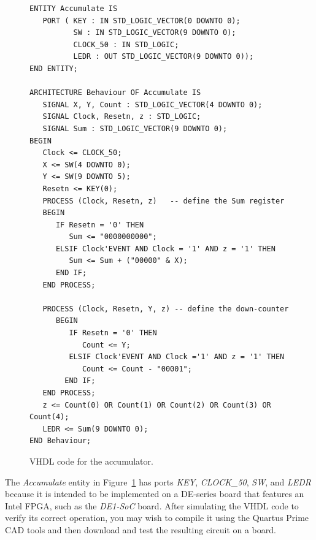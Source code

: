 \documentclass[11pt, twoside, pdftex]{article}
\begin{document}
\lstset{language=VHDL,numbers=none,escapechar=?}
\begin{figure}[hb!]
\begin{center}
\begin{minipage}[t]{15 cm}
\begin{lstlisting}[name=accumulate]
ENTITY Accumulate IS
   PORT ( KEY : IN STD_LOGIC_VECTOR(0 DOWNTO 0);
          SW : IN STD_LOGIC_VECTOR(9 DOWNTO 0);  
          CLOCK_50 : IN STD_LOGIC;
          LEDR : OUT STD_LOGIC_VECTOR(9 DOWNTO 0));
END ENTITY; 

ARCHITECTURE Behaviour OF Accumulate IS
   SIGNAL X, Y, Count : STD_LOGIC_VECTOR(4 DOWNTO 0); 
   SIGNAL Clock, Resetn, z : STD_LOGIC;
   SIGNAL Sum : STD_LOGIC_VECTOR(9 DOWNTO 0);
BEGIN
   Clock <= CLOCK_50;
   X <= SW(4 DOWNTO 0);
   Y <= SW(9 DOWNTO 5);
   Resetn <= KEY(0);
   PROCESS (Clock, Resetn, z)   -- define the Sum register
   BEGIN 
      IF Resetn = '0' THEN
         Sum <= "0000000000";
      ELSIF Clock'EVENT AND Clock = '1' AND z = '1' THEN
         Sum <= Sum + ("00000" & X);
      END IF;
   END PROCESS;

   PROCESS (Clock, Resetn, Y, z) -- define the down-counter
      BEGIN
         IF Resetn = '0' THEN
            Count <= Y;
         ELSIF Clock'EVENT AND Clock ='1' AND z = '1' THEN
            Count <= Count - "00001";
        END IF;
   END PROCESS;
   z <= Count(0) OR Count(1) OR Count(2) OR Count(3) OR Count(4);
   LEDR <= Sum(9 DOWNTO 0);
END Behaviour;
\end{lstlisting}
\end{minipage}
\caption{VHDL code for the accumulator.}
\label{fig:accumulate}
\end{center}
\end{figure}
\clearpage

\noindent
The {\it Accumulate} entity in Figure~\ref{fig:accumulate} has ports {\it KEY}, 
{\it CLOCK\_50}, {\it SW}, and {\it LEDR} because it is intended to be implemented
on a DE-series board that features an Intel FPGA, such as the {\it DE1-SoC} board. After 
simulating the VHDL code to verify its correct operation, you may
wish to compile it using the Quartus Prime CAD tools and then download and test the 
resulting circuit on a board.  
\end{document}
